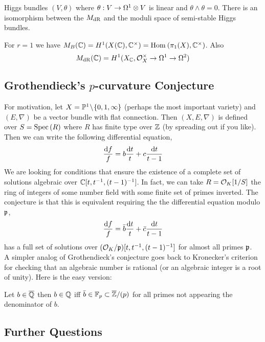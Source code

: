 \documentclass[12pt]{article}
\begin{document}
\begin{theorem}[Simpson, '90s] Higgs bundles $(V, \theta)$ where $\theta : V \to \Omega^1 \otimes V$ is linear and $\theta \wedge \theta = 0$. There is an isomorphism between the $M_{\mathrm{dR}}$ and the moduli space of semi-stable Higgs bundles.
\end{theorem}

\begin{example}
For $r = 1$ we have $M_B(\mathbb{C}) = H^1(X(\mathbb{C}), \mathbb{C}^\times) = \mathrm{Hom}_{} \left( \pi_1(X), \mathbb{C}^\times \right)$. Also
\[ M_{\mathrm{dR}}(\mathbb{C}) = H^1(X_{\mathbb{C}}, \mathcal{O}_{X}^\times \to \Omega^1 \to \Omega^2) \] 
\end{example}

\subsection{Grothendieck's $p$-curvature Conjecture}

For motivation, let $X = \mathbb{P}^1 \! \setminus \! \{ 0,1, \infty \}$ (perhaps the most important variety) and $(E, \nabla)$ be a vector bundle with flat connection. Then $(X, E, \nabla)$ is defined over $S = \mathrm{Spec}\left( R \right)$ where $R$ has finite type over $\mathbb{Z}$ (by spreading out if you like). Then we can write the following differential equation,
\[ \frac{\mathrm{d}{f}}{f} = b \frac{\mathrm{d}{t}}{t} + c \frac{\mathrm{d}{t}}{t - 1} \]
We are looking for conditions that ensure the existence of a complete set of solutions algebraic over $\mathbb{C}[t, t^{-1}, (t-1)^{-1}]$. In fact, we can take $R = \mathcal{O}_{K}[1/S]$ the ring of integers of some number field with some finite set of primes inverted. The conjecture is that this is equivalent requiring the the differential equation modulo $\mathfrak{p}$,
\[ \frac{\mathrm{d}{f}}{f} = \bar{b} \frac{\mathrm{d}{t}}{t} + \bar{c} \frac{\mathrm{d}{t}}{t-1} \]
has a full set of solutions over $(\mathcal{O}_{K} / \mathfrak{p})[t, t^{-1}, (t-1)^{-1}]$ for almost all primes $\mathfrak{p}$.
\bigskip\\
A simpler analog of Grothendieck's conjecture goes back to Kronecker's criterion for checking that an algebraic number is rational (or an algebraic integer is a root of unity). Here is the easy version:
\begin{center}
Let $b \in \overline{\mathbb{Q}}$ then $b \in \mathbb{Q}$ iff $\bar{b} \in \mathbb{F}_p \subset \overline{\mathbb{Z}} / (p)$ for all primes not appearing the denominator of $b$.
\end{center}

\subsection{Further Questions}
\end{document}
